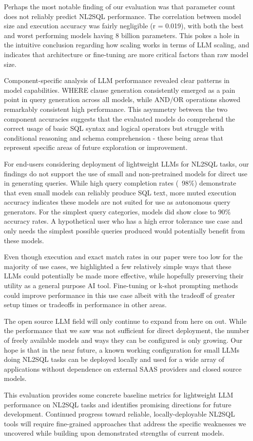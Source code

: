 \documentclass[sigconf]{acmart}
\begin{document}
Perhaps the most notable finding of our evaluation was that parameter count does not reliably predict NL2SQL performance. 
The correlation between model size and execution accuracy was fairly negligible (r = 0.019), with both the best and worst 
performing models having 8 billion parameters. This pokes a hole in the intuitive conclusion regarding how scaling works
in terms of LLM scaling, and indicates that architecture or fine-tuning are more critical factors than raw model size.

Component-specific analysis of LLM performance revealed clear patterns in model capabilities. WHERE clause generation 
consistently emerged as a pain point in query generation across all models, while AND/OR operations showed remarkably 
consistent high performance. This asymmetry between the two component accuracies suggests that the evaluated models 
do comprehend the correct usage of basic SQL syntax and logical operators but struggle with conditional reasoning and 
schema comprehension - these being areas that represent specific areas of future exploration or improvement.

For end-users considering deployment of lightweight LLMs for NL2SQL tasks, our findings do not support the use of small
and non-pretrained models for direct use in generating queries. While high query completion rates (~98\%) demonstrate 
that even small models can reliably produce SQL text, more muted execution accuracy indicates these models are not suited
for use as autonomous query generators. For the simplest query categories, models did show close to 90\% accuracy rates.
A hypothetical user who has a high error tolerance use case and only needs the simplest possible queries produced would 
potentially benefit from these models.

Even though execution and exact match rates in our paper were too low for the majority of use cases, we highlighted a 
few relatively simple ways that these LLMs could potentially be made more effective, while hopefully preserving their 
utility as a general purpose AI tool. Fine-tuning or k-shot prompting methods could improve performance in this use case
albeit with the tradeoff of greater setup times or tradeoffs in performance in other areas. 

The open source LLM field will only continue to expand from here on out. While the performance that we saw was not 
sufficient for direct deployment, the number of freely available models and ways they can be configured is only growing.
Our hope is that in the near future, a known working configuration for small LLMs doing NL2SQL tasks can be deployed 
locally and used for a wide array of applications without dependence on external SAAS providers and closed source models.

This evaluation provides some concrete baseline metrics for lightweight LLM performance on NL2SQL tasks and identifies 
promising directions for future development. Continued progress toward reliable, locally-deployable NL2SQL tools will 
require fine-grained approaches that address the specific weaknesses we uncovered while building upon 
demonstrated strengths of current models.

\balance


\end{document}
